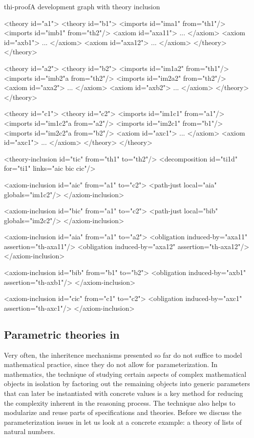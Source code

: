 \begin{myfig}{thi-proof}{A development graph with theory inclusion}
\begin{center}
\begin{boxedverbatim}
<theory id="a1">                  <theory id="b1">
 <imports id="ima1" from="th1"/>   <imports id="imb1" from="th2"/>
 <axiom id="axa11"> ... </axiom>    <axiom id="axb1"> ... </axiom>
 <axiom id="axa12"> ... </axiom>   </theory>
</theory>

<theory id="a2">                  <theory id="b2">
 <imports id="im1a2" from="th1"/>  <imports id="imb2"a from="th2"/>
 <imports id="im2a2" from="th2"/> 
 <axiom id="axa2"> ... </axiom>    <axiom id="axb2"> ... </axiom>
</theory>                         </theory>

<theory id="c1">                  <theory id="c2">
 <imports id="im1c1" from="a1"/>  <imports id="im1c2"a from="a2"/>
 <imports id="im2c1" from="b1"/>  <imports id="im2c2"a from="b2"/>
 <axiom id="axc1"> ... </axiom>    <axiom id="axc1"> ... </axiom>
</theory>                          </theory>

<theory-inclusion id="tic" from="th1" to="th2"/>
<decomposition id="ti1d" for="ti1" links="aic bic cic"/>

<axiom-inclusion id="aic" from="a1" to="c2">
 <path-just local="aia" globals="im1c2"/>
</axiom-inclusion>

<axiom-inclusion id="bic" from="a1" to="c2">
 <path-just local="bib" globals="im2c2"/>
</axiom-inclusion>

<axiom-inclusion id="aia" from="a1" to="a2">
 <obligation induced-by="axa11" assertion="th-axa11"/>
 <obligation induced-by="axa12" assertion="th-axa12"/>
</axiom-inclusion>

<axiom-inclusion id="bib" from="b1" to="b2">
 <obligation induced-by="axb1" assertion="th-axb1"/>
</axiom-inclusion>

<axiom-inclusion id="cic" from="c1" to="c2">
 <obligation induced-by="axc1" assertion="th-axc1"/>
</axiom-inclusion>
\end{boxedverbatim}
\end{center}
\end{myfig}

\subsection{Parametric theories in {\else{\omdoc}\fi}}\label{sec:parametric-theories}

Very often, the inheritence mechanisms presented so far do not suffice to model
mathematical practice, since they do not allow for parameterization. In
mathematics, the technique of studying certain aspects of complex mathematical
objects in isolation by factoring out the remaining objects into generic
parameters that can later be instantiated with concrete values is a key method for
reducing the complexity inherent in the reasoning process. The technique also
helps to modularize and reuse parts of specifications and theories. Before we
discuss the parameterization issues in {\omdoc} let us look at a concrete example:
a theory of lists of natural numbers.


